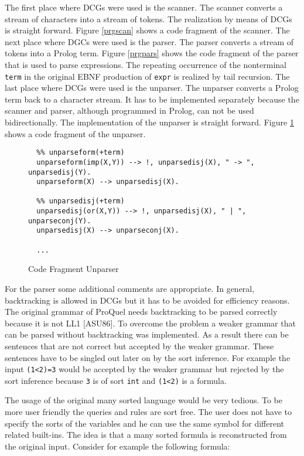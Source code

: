 The first place where DCGs were used is the scanner. The scanner converts a stream of characters 
into a stream of tokens. The realization by means of DCGs is straight forward. Figure \ref{prgscan} 
shows a code fragment of the scanner. The next place where DGCs were used is the parser. The parser 
converts a stream of tokens into a Prolog term. Figure \ref{prgpars} shows the code fragment of the 
parser that is used to parse expressions. The repeating occurrence of the nonterminal \verb.term. 
in the original EBNF production of \verb.expr. is realized by tail recursion. The last place where 
DCGs were used is the unparser. The unparser converts a Prolog term back to a character stream. It 
has to be implemented separately because the scanner and parser, although programmed in Prolog, 
can not be used bidirectionally. The implementation of the unparser is straight forward. Figure 
\ref{prgunpars} shows a code fragment of the unparser.

\begin{figure}
{\small
\begin{verbatim}
  %% unparseform(+term)
  unparseform(imp(X,Y)) --> !, unparsedisj(X), " -> ", unparsedisj(Y).
  unparseform(X) --> unparsedisj(X).

  %% unparsedisj(+term)
  unparsedisj(or(X,Y)) --> !, unparsedisj(X), " | ", unparseconj(Y).
  unparsedisj(X) --> unparseconj(X).

  ...
\end{verbatim}
}
\caption{Code Fragment Unparser}
\label{prgunpars}
\end{figure}
 
For the parser some additional comments are appropriate. In general, backtracking is allowed
in DCGs but it has to be avoided for efficiency reasons. The original grammar of ProQuel 
needs backtracking to be parsed correctly because it is not LL1 [ASU86]. To overcome the problem 
a weaker grammar that can be parsed without backtracking was implemented. As a result there can 
be sentences that are not correct but accepted by the weaker grammar. These sentences have to 
be singled out later on by the sort inference. For example the input \verb.(1<2)=3. would be 
accepted by the weaker grammar but rejected by the sort inference because \verb.3. is of 
sort \verb.int. and \verb.(1<2). is a formula.

\label{secsorti}
The usage of the original many sorted language would be very tedious. To be more user friendly 
the queries and rules are sort free. The user does not have to specify the sorts of the variables 
and he can use the same symbol for different related built-ins. The idea is that a many sorted 
formula is reconstructed from the original input. Consider for example the following formula:

